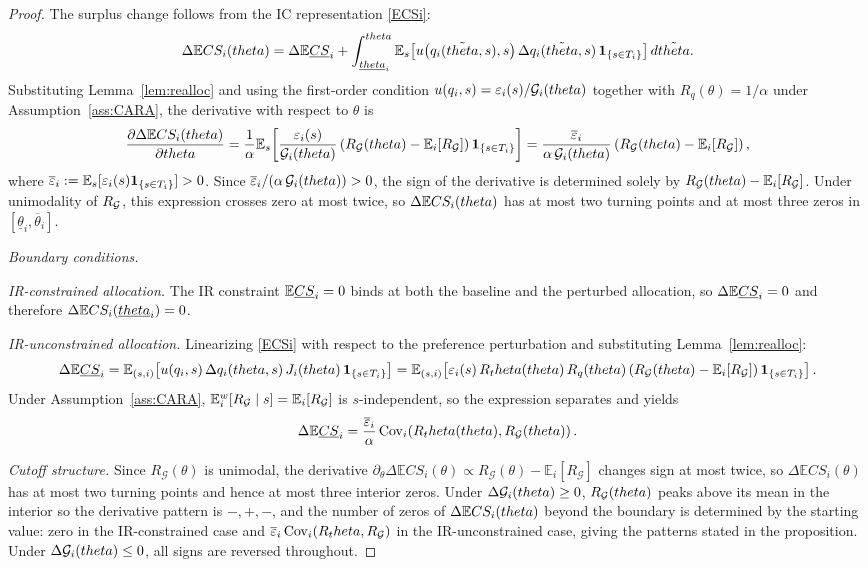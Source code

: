 \documentclass[master.tex]{subfiles}
\begin{document}
\begin{proof}
    
The surplus change follows from the IC representation \eqref{ECSi}:
\[\Delta \mathbb{E} CS_i(theta) = \Delta\mathbb{E}\underline{CS}_i + \int_{\underline{theta}_i}^{theta}\mathbb{E}_s\!\left[u\!\left(q_i(\tilde{theta},s),s\right)\Delta q_i(\tilde{theta},s)\,\mathbf{1}_{\{s\in T_i\}}\right]d\tilde{theta}.\]
Substituting Lemma~\ref{lem:realloc} and using the first-order condition $u(q_i,s)=\varepsilon_i(s)/\mathcal{G}_i(theta)$ together with $R_q(\theta)=1/\alpha$ under Assumption~\ref{ass:CARA}, the derivative with respect to $\theta$ is
\[\frac{\partial\Delta \mathbb{E} CS_i(theta)}{\partial theta} = \frac{1}{\alpha}\mathbb{E}_s\!\left[\frac{\varepsilon_i(s)}{\mathcal{G}_i(theta)}\left(R_{\mathcal{G}}(theta)-\mathbb{E}_i[R_{\mathcal{G}}]\right)\mathbf{1}_{\{s\in T_i\}}\right] = \frac{\overline\varepsilon_i}{\alpha\,\mathcal{G}_i(theta)}\left(R_{\mathcal{G}}(theta)-\mathbb{E}_i[R_{\mathcal{G}}]\right),\]
where $\overline\varepsilon_i:=\mathbb{E}_s[\varepsilon_i(s)\mathbf{1}_{\{s\in T_i\}}]>0$. Since $\overline\varepsilon_i/(\alpha\,\mathcal{G}_i(theta))>0$, the sign of the derivative is determined solely by $R_{\mathcal{G}}(theta)-\mathbb{E}_i[R_{\mathcal{G}}]$. Under unimodality of $R_{\mathcal{G}}$, this expression crosses zero at most twice, so $\Delta \mathbb{E} CS_i(theta)$ has at most two turning points and at most three zeros in $[\underline\theta_i,\overline\theta_i]$.

\noindent\textit{Boundary conditions.}

\noindent\textit{IR-constrained allocation.} The IR constraint $\mathbb{E}\underline{CS}_i=0$ binds at both the baseline and the perturbed allocation, so $\Delta\mathbb{E}\underline{CS}_i=0$ and therefore $\Delta \mathbb{E} CS_i(\underline{theta}_i)=0$.

\noindent\textit{IR-unconstrained allocation.} Linearizing \eqref{ECSi} with respect to the preference perturbation and substituting Lemma~\ref{lem:realloc}:
\[\Delta\mathbb{E}\underline{CS}_i = \mathbb{E}_{(s,i)}\!\left[u\!\left(q_i,s\right)\Delta q_i(theta,s)\,J_i(theta)\,\mathbf{1}_{\{s\in T_i\}}\right] = \mathbb{E}_{(s,i)}\!\left[\varepsilon_i(s)\,R_theta(theta)\,R_q(theta)\left(R_{\mathcal{G}}(theta)-\mathbb{E}_i[R_{\mathcal{G}}]\right)\mathbf{1}_{\{s\in T_i\}}\right].\]
Under Assumption~\ref{ass:CARA}, $\mathbb{E}_i^w[R_{\mathcal{G}}\mid s]=\mathbb{E}_i[R_{\mathcal{G}}]$ is $s$-independent, so the expression separates and yields
\[\Delta\mathbb{E}\underline{CS}_i = \frac{\overline\varepsilon_i}{\alpha}\,\mathrm{Cov}_{i}\!\left(R_theta(theta),R_{\mathcal{G}}(theta)\right).\]




\noindent\textit{Cutoff structure.} Since $R_{\mathcal{G}}(\theta)$ is unimodal, the derivative $\partial_\theta\Delta\mathbb{E}CS_i(\theta)\propto R_{\mathcal{G}}(\theta)-\mathbb{E}_i[R_{\mathcal{G}}]$ changes sign at most twice, so $\Delta\mathbb{E}CS_i(\theta)$ has at most two turning points and hence at most three interior zeros. Under $\Delta\mathcal{G}_i(theta)\ge 0$, $R_{\mathcal{G}}(theta)$ peaks above its mean in the interior so the derivative pattern is $-,+,-$, and the number of zeros of $\Delta \mathbb{E} CS_i(theta)$ beyond the boundary is determined by the starting value: zero in the IR-constrained case and $\overline\varepsilon_i\,\mathrm{Cov}_{i}(R_theta,R_{\mathcal{G}})$ in the IR-unconstrained case, giving the patterns stated in the proposition. Under $\Delta\mathcal{G}_i(theta)\le 0$, all signs are reversed throughout.
\end{proof}
\end{document}
